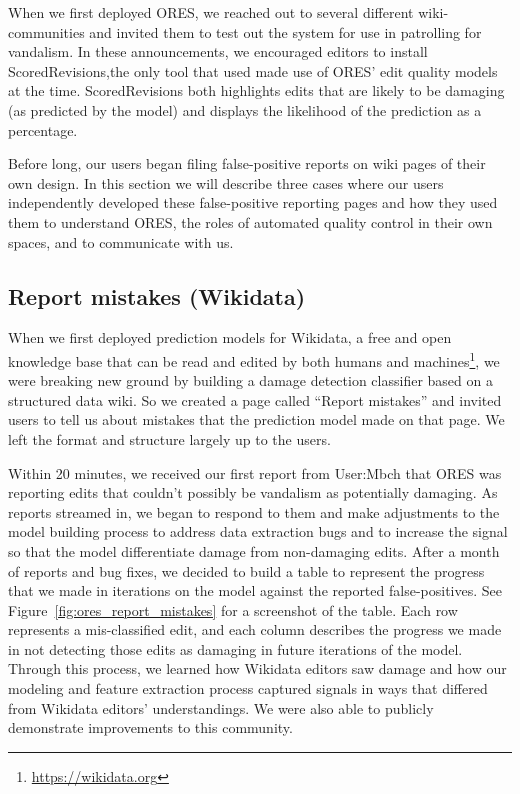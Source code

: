 When we first deployed ORES, we reached out to several different wiki-communities and invited them to test out the system for use in patrolling for vandalism.  In these announcements, we encouraged editors to install ScoredRevisions,the only tool that used made use of ORES' edit quality models at the time.  ScoredRevisions both highlights edits that are likely to be damaging (as predicted by the model) and displays the likelihood of the prediction as a percentage.

Before long, our users began filing false-positive reports on wiki pages of their own design.  In this section we will describe three cases where our users independently developed these false-positive reporting pages and how they used them to understand ORES, the roles of automated quality control in their own spaces, and to communicate with us.

\subsection{Report mistakes (Wikidata)}

When we first deployed prediction models for Wikidata, a free and open knowledge base that can be read and edited by both humans and machines\footnote{\url{https://wikidata.org}}, we were breaking new ground by building a damage detection classifier based on a structured data wiki\cite{sarabadani2017building}.  So we created a page called ``Report mistakes'' and invited users to tell us about mistakes that the prediction model made on that page. We left the format and structure largely up to the users.

Within 20 minutes, we received our first report from User:Mbch that ORES was reporting edits that couldn't possibly be vandalism as potentially damaging.  As reports streamed in, we began to respond to them and make adjustments to the model building process to address data extraction bugs and to increase the signal so that the model differentiate damage from non-damaging edits.  After a month of reports and bug fixes, we decided to build a table to represent the progress that we made in iterations on the model against the reported false-positives.  See Figure~\ref{fig:ores_report_mistakes} for a screenshot of the table.  Each row represents a mis-classified edit, and each column describes the progress we made in not detecting those edits as damaging in future iterations of the model.  Through this process, we learned how Wikidata editors saw damage and how our modeling and feature extraction process captured signals in ways that differed from Wikidata editors' understandings.  We were also able to publicly demonstrate improvements to this community.

